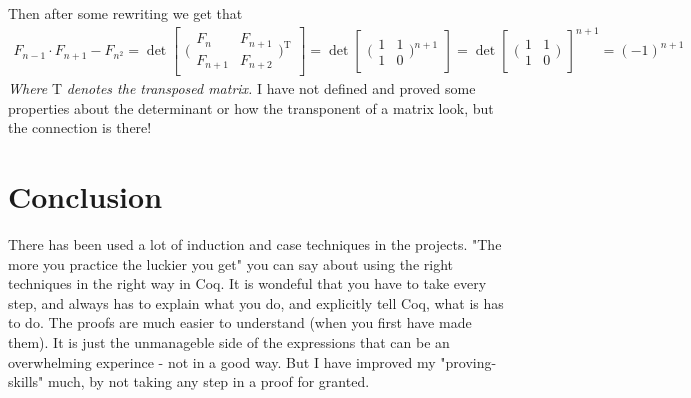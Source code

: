 \documentclass[a4paper,10p,danish]{article}
\begin{document}
Then after some rewriting we get that 
\begin{align*}
F_{n-1} \cdot F_{n+1} - F_{n^2} = \det \begin{bmatrix}
(\begin{smallmatrix} F_n & F_{n+1}\\ F_{n+1} & F_{n+2} \end{smallmatrix} \bigr)^\text{T} \end{bmatrix} = \det \begin{bmatrix}
(\begin{smallmatrix}
1 & 1\\
1 & 0 
\end{smallmatrix}\bigr)^{n+1}
\end{bmatrix} = \det \begin{bmatrix}
(\begin{smallmatrix}
1 & 1\\
1 & 0 
\end{smallmatrix}\bigr)
\end{bmatrix}^{n+1} = (-1)^{n+1}
\end{align*}
\textit{Where} T \textit{denotes the transposed matrix.} 
I have not defined and proved some properties about the determinant or how the transponent of a matrix look, but the connection is there! 

\section{Conclusion}
There has been used a lot of induction and case techniques in the projects. "The more you practice the luckier you get" you can say about using the right techniques in the right way in Coq. It is wondeful that you have to take every step, and always has to explain what you do, and explicitly tell Coq, what is has to do. The proofs are much easier to understand (when you first have made them). It is just the unmanageble side of the expressions that can be an overwhelming experince - not in a good way. But I have improved my "proving-skills" much, by not taking any step in a proof for granted. 
\end{document}
